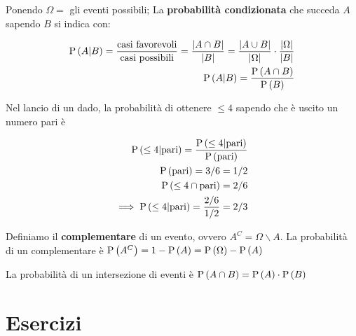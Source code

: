 \begin{defn}
	
	Ponendo $ \Omega = $ gli eventi possibili;
	La \textbf{probabilità condizionata} che succeda $ A $ sapendo $ B $ si indica con:
	
	\begin{equation}
	\begin{aligned}
	\text{P}\left(A|B\right) = \dfrac{\text{casi favorevoli}}{\text{casi possibili}} = \dfrac{\lvert A \cap B\rvert}{\lvert B\rvert} = \dfrac{\lvert A \cup B\rvert}{\lvert\Omega\rvert} \cdot \dfrac{\lvert\Omega\rvert}{\lvert B\rvert} \\
	\text{P}\left(A|B\right) = \dfrac{\text{P}\left(A \cap B\right)}{\text{P}\left(B\right)}	
	\end{aligned}
	\end{equation}
	
\end{defn}

\begin{exmp}
	Nel lancio di un dado, la probabilità di ottenere $ \leq 4 $ sapendo che è uscito un numero pari è
	
	\begin{equation*}
	\begin{aligned}
	\text{P}\left(\leq 4|\text{pari}\right) = \dfrac{\text{P}\left(\leq 4 | \text{pari}\right)}{\text{P}\left(\text{pari}\right)} \\
	\text{P}\left(\text{pari}\right) = 3/6 = 1/2 \\
	\text{P}\left(\leq 4 \cap \text{pari}\right) = 2/6 \\
	\implies \text{P}\left(\leq 4|\text{pari}\right) = \dfrac{2/6}{1/2} = 2/3
	\end{aligned}
	\end{equation*}
\end{exmp}

\begin{defn}
	Definiamo il \textbf{complementare} di un evento, ovvero $ A^C=\Omega \backslash A $. La probabilità di un complementare è $ \text{P}\left(A^C\right) = 1 - \text{P}\left(A\right) = \text{P}\left(\Omega\right) - \text{P}\left(A\right) $
	
	La probabilità di un intersezione di eventi è $ \text{P}\left(A \cap B\right) = \text{P}\left(A\right) \cdot \text{P}\left(B\right) $
\end{defn}

\section{Esercizi}

